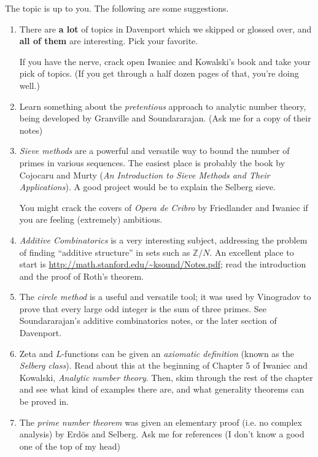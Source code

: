 \documentclass[12pt]{article}
\begin{document}
The topic is up to you. The following are some suggestions.
\begin{enumerate}
\item There are {\bf a lot} of topics in Davenport which we skipped or glossed over, and {\bf all of them}
are interesting. Pick your favorite.

If you have the nerve, crack open Iwaniec and Kowalski's book and take your pick of topics. (If you get through
a half dozen pages of that, you're doing well.)

\item Learn something about the {\itshape pretentious} approach to analytic number theory, being
developed by Granville and Soundararajan. (Ask me for a copy of their notes)

\item {\itshape Sieve methods} are a powerful and versatile way to bound the number of primes in
various sequences. The easiest place is probably the book by Cojocaru and Murty ({\itshape An Introduction to
Sieve Methods and Their Applications}). A good project would be to explain the Selberg sieve.

You might crack the covers of {\itshape Opera de Cribro} by Friedlander and Iwaniec if you are feeling
(extremely) ambitious.

\item {\itshape Additive Combinatorics} is a very interesting subject, addressing the problem of finding
``additive structure'' in sets such as $\mathbb{Z}/N$. An excellent place to start is 
\url{http://math.stanford.edu/~ksound/Notes.pdf}; read the introduction and the proof of Roth's
theorem. 

\item The {\itshape circle method} is a useful and versatile tool; it was used by Vinogradov to prove
that every large odd integer is the sum of three primes. See Soundararajan's additive combinatorics notes,
or the later section of Davenport.

\item Zeta and $L$-functions can be given an {\itshape axiomatic definition} (known as the {\itshape Selberg
class}). Read about this at the beginning of Chapter 5 of Iwaniec and Kowalski, {\itshape Analytic number theory}.
Then, skim through the rest of the chapter and see what kind of examples there are, and what generality
theorems can be proved in.

\item The {\itshape prime number theorem} was given an elementary proof (i.e. no complex analysis) by Erd\"os 
and Selberg. Ask me for references (I don't know a good one of the top of my head)


\end{enumerate}
\end{document}
